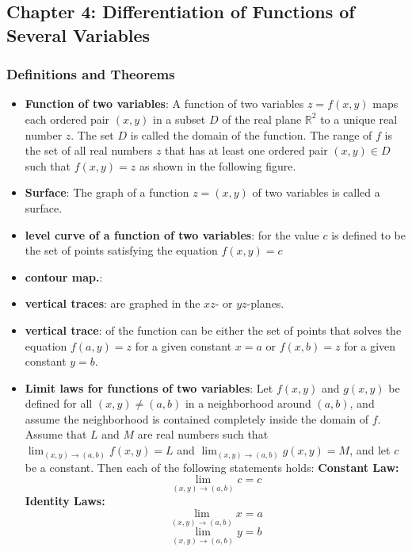 \documentclass{report}
\begin{document}
    \pagebreak 
    \subsection{Chapter 4: Differentiation of Functions of Several Variables}
    \bigbreak \noindent 
    \subsubsection{Definitions and Theorems}
    \begin{itemize}
        \item \textbf{Function of two variables}:
            A function of two variables $z=f(x,y)$ maps each ordered pair $(x,y)$ in a subset $D$ of the real plane $\mathbb{R}^2$ to a unique real number $z$. The set $D$ is called the domain of the function. The range of $f$ is the set of all real numbers $z$ that has at least one ordered pair $(x,y) \in D$ such that $f(x,y) = z$ as shown in the following figure.
        \item \textbf{Surface}: The graph of a function  $z=(x,y)$ of two variables is called a surface.
        \item \textbf{level curve of a function of two variables}: for the value  $c$ is defined to be the set of points satisfying the equation  $f(x,y)=c$
        \item \textbf{contour map.}:
        \item \textbf{vertical traces}: are graphed in the  $xz$- or  $yz$-planes.
        \item \textbf{vertical trace}: of the function can be either the set of points that solves the equation $f(a,y)=z$ for a given constant $x=a$ or $f(x,b)=z$ for a given constant $y=b$.
        \item \textbf{Limit laws for functions of two variables}:
            Let $f(x,y)$ and $g(x,y)$ be defined for all $(x,y) \neq (a,b)$ in a neighborhood around $(a,b)$, and assume the neighborhood is contained completely inside the domain of $f$. Assume that $L$ and $M$ are real numbers such that $\lim_{(x,y) \to (a,b)} f(x,y) = L$ and $\lim_{(x,y) \to (a,b)} g(x,y) = M$, and let $c$ be a constant. Then each of the following statements holds:
            \bigbreak \noindent 
            \textbf{Constant Law:}
            \[
                \lim_{(x,y) \to (a,b)} c = c \tag{4.2}
            \]
            \textbf{Identity Laws:}
            \[
                \lim_{(x,y) \to (a,b)} x = a \tag{4.3}
            \]
            \[
                \lim_{(x,y) \to (a,b)} y = b \tag{4.4}
\]
\end{itemize}
\end{document}

